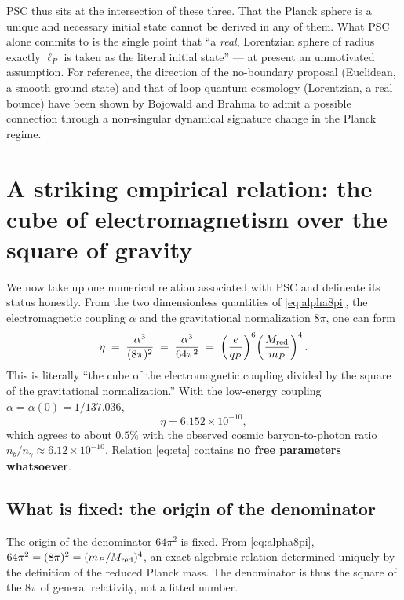 \documentclass[11pt,a4paper]{article}
\newcommand{\eP}{\ell_P}
\begin{document}
PSC thus sits at the intersection of these three. That the Planck sphere is a unique and necessary initial state cannot be derived in any of them. What PSC alone commits to is the single point that ``a \emph{real}, Lorentzian sphere of radius exactly $\eP$ is taken as the literal initial state'' --- at present an unmotivated assumption. For reference, the direction of the no-boundary proposal (Euclidean, a smooth ground state) and that of loop quantum cosmology (Lorentzian, a real bounce) have been shown by Bojowald and Brahma to admit a possible connection through a non-singular dynamical signature change in the Planck regime.

\section{A striking empirical relation: the cube of electromagnetism over the square of gravity}
We now take up one numerical relation associated with PSC and delineate its status honestly. From the two dimensionless quantities of \eqref{eq:alpha8pi}, the electromagnetic coupling $\alpha$ and the gravitational normalization $8\pi$, one can form
\begin{equation}
\eta \;=\; \frac{\alpha^3}{(8\pi)^2} \;=\; \frac{\alpha^3}{64\pi^2}
\;=\; \left(\frac{e}{q_P}\right)^{6}\!\left(\frac{M_{\rm red}}{m_P}\right)^{4}.
\label{eq:eta}
\end{equation}
This is literally ``the cube of the electromagnetic coupling divided by the square of the gravitational normalization.'' With the low-energy coupling $\alpha=\alpha(0)=1/137.036$,
\begin{equation}
\eta = 6.152\times10^{-10},
\end{equation}
which agrees to about $0.5\%$ with the observed cosmic baryon-to-photon ratio $n_b/n_\gamma \approx 6.12\times10^{-10}$. Relation \eqref{eq:eta} contains \textbf{no free parameters whatsoever}.

\subsection{What is fixed: the origin of the denominator}
The origin of the denominator $64\pi^2$ is fixed. From \eqref{eq:alpha8pi}, $64\pi^2 = (8\pi)^2 = (m_P/M_{\rm red})^4$, an exact algebraic relation determined uniquely by the definition of the reduced Planck mass. The denominator is thus the square of the $8\pi$ of general relativity, not a fitted number.
\end{document}
